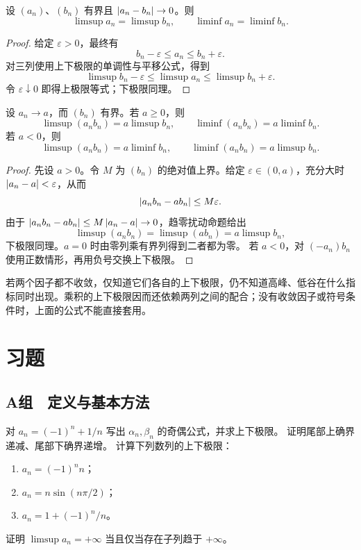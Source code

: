 \begin{proposition}[趋零扰动]
设 \((a_n)\)、\((b_n)\) 有界且
\(\left|a_n-b_n\right|\to0\)。则
\[
 \limsup a_n=\limsup b_n,\qquad
 \liminf a_n=\liminf b_n.
\]
\end{proposition}

\begin{proof}
给定 \(\varepsilon>0\)，最终有
\[
 b_n-\varepsilon\le a_n\le b_n+\varepsilon.
\]
对三列使用上下极限的单调性与平移公式，得到
\[
 \limsup b_n-\varepsilon
 \le\limsup a_n
 \le\limsup b_n+\varepsilon.
\]
令 \(\varepsilon\downarrow0\) 即得上极限等式；下极限同理。
\end{proof}

\begin{proposition}[一个因子收敛时的乘法公式]
设 \(a_n\to a\)，而 \((b_n)\) 有界。若 \(a\ge0\)，则
\[
 \limsup(a_nb_n)=a\limsup b_n,\qquad
 \liminf(a_nb_n)=a\liminf b_n.
\]
若 \(a<0\)，则
\[
 \limsup(a_nb_n)=a\liminf b_n,\qquad
 \liminf(a_nb_n)=a\limsup b_n.
\]
\end{proposition}

\begin{proof}
先设 \(a>0\)。令 \(M\) 为 \((b_n)\) 的绝对值上界。给定
\(\varepsilon\in(0,a)\)，充分大时
\(\left|a_n-a\right|<\varepsilon\)，从而
\[
 \left|a_nb_n-ab_n\right|\le M\varepsilon.
\]
由于
\(\left|a_nb_n-ab_n\right|\le M\left|a_n-a\right|\to0\)，趋零扰动命题给出
\[
 \limsup(a_nb_n)=\limsup(ab_n)=a\limsup b_n,
\]
下极限同理。\(a=0\) 时由零列乘有界列得到二者都为零。
若 \(a<0\)，对 \((-a_n)b_n\) 使用正数情形，再用负号交换上下极限。
\end{proof}

若两个因子都不收敛，仅知道它们各自的上下极限，仍不知道高峰、低谷在什么指标同时出现。乘积的上下极限因而还依赖两列之间的配合；没有收敛因子或符号条件时，上面的公式不能直接套用。

\section*{习题}

\subsection*{A组　定义与基本方法}
\begin{enumerate}[label=\textbf{\thechapter.\arabic*.}]
  对 \(a_n=(-1)^n+1/n\) 写出 \(\alpha_n,\beta_n\) 的奇偶公式，并求上下极限。
  证明尾部上确界递减、尾部下确界递增。
  计算下列数列的上下极限：
 \begin{enumerate}[label=(\arabic*)]
  \item \(a_n=(-1)^n n\)；
  \item \(a_n=n\sin(n\pi/2)\)；
  \item \(a_n=1+(-1)^n/n\)。
 \end{enumerate}
  证明 \(\limsup a_n=+\infty\) 当且仅当存在子列趋于 \(+\infty\)。
\end{enumerate}

